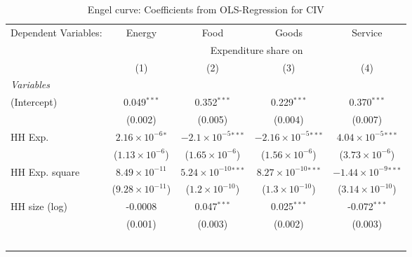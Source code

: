 
\begin{table}[htbp!]
   \centering
   \small
   \begin{adjustbox}{width = 1\textwidth, max height = 0.95\textheight, center}
      \begin{threeparttable}[b]
         \caption{\label{tab:Engel_parametric_CIV} Engel curve: Coefficients from OLS-Regression for CIV}
         \begin{tabular}{lcccc}
            \tabularnewline \midrule \midrule
            Dependent Variables: & Energy                      & Food                           & Goods                          & Service\\  
             & \multicolumn{4}{c}{Expenditure share on} \\ 
                                 & (1)                         & (2)                            & (3)                            & (4)\\  
            \midrule
            \emph{Variables}\\
            (Intercept)          & 0.049$^{***}$               & 0.352$^{***}$                  & 0.229$^{***}$                  & 0.370$^{***}$\\   
                                 & (0.002)                     & (0.005)                        & (0.004)                        & (0.007)\\   
            HH Exp.              & $2.16\times 10^{-6}$$^{*}$  & $-2.1\times 10^{-5}$$^{***}$   & $-2.16\times 10^{-5}$$^{***}$  & $4.04\times 10^{-5}$$^{***}$\\    
                                 & ($1.13\times 10^{-6}$)      & ($1.65\times 10^{-6}$)         & ($1.56\times 10^{-6}$)         & ($3.73\times 10^{-6}$)\\    
            HH Exp. square       & $8.49\times 10^{-11}$       & $5.24\times 10^{-10}$$^{***}$  & $8.27\times 10^{-10}$$^{***}$  & $-1.44\times 10^{-9}$$^{***}$\\    
                                 & ($9.28\times 10^{-11}$)     & ($1.2\times 10^{-10}$)         & ($1.3\times 10^{-10}$)         & ($3.14\times 10^{-10}$)\\    
            HH size (log)        & -0.0008                     & 0.047$^{***}$                  & 0.025$^{***}$                  & -0.072$^{***}$\\   
                                 & (0.001)                     & (0.003)                        & (0.002)                        & (0.003)\\   
$$
\end{tabular}
\end{threeparttable}
\end{adjustbox}
\end{table}
